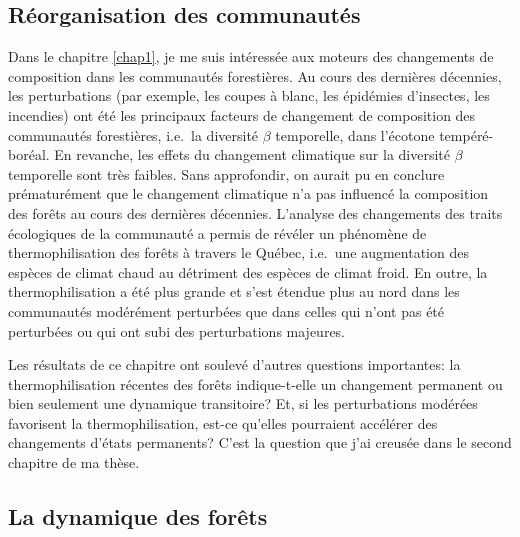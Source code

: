 \hypertarget{ruxe9organisation-des-communautuxe9s}{%
\subsection{Réorganisation des
communautés}\label{ruxe9organisation-des-communautuxe9s}}

Dans le chapitre \ref{chap1}, je me suis intéressée aux moteurs des
changements de composition dans les communautés forestières. Au cours
des dernières décennies, les perturbations (par exemple, les coupes à
blanc, les épidémies d'insectes, les incendies) ont été les principaux
facteurs de changement de composition des communautés forestières,
i.e.~la diversité \(\beta\) temporelle, dans l'écotone tempéré-boréal.
En revanche, les effets du changement climatique sur la diversité
\(\beta\) temporelle sont très faibles. Sans approfondir, on aurait pu
en conclure prématurément que le changement climatique n'a pas influencé
la composition des forêts au cours des dernières décennies. L'analyse
des changements des traits écologiques de la communauté a permis de
révéler un phénomène de thermophilisation des forêts à travers le
Québec, i.e.~une augmentation des espèces de climat chaud au détriment
des espèces de climat froid. En outre, la thermophilisation a été plus
grande et s'est étendue plus au nord dans les communautés modérément
perturbées que dans celles qui n'ont pas été perturbées ou qui ont subi
des perturbations majeures.

Les résultats de ce chapitre ont soulevé d'autres questions importantes:
la thermophilisation récentes des forêts indique-t-elle un changement
permanent ou bien seulement une dynamique transitoire? Et, si les
perturbations modérées favorisent la thermophilisation, est-ce qu'elles
pourraient accélérer des changements d'états permanents? C'est la
question que j'ai creusée dans le second chapitre de ma thèse.

\hypertarget{la-dynamique-des-foruxeats}{%
\subsection{La dynamique des forêts}\label{la-dynamique-des-foruxeats}}

